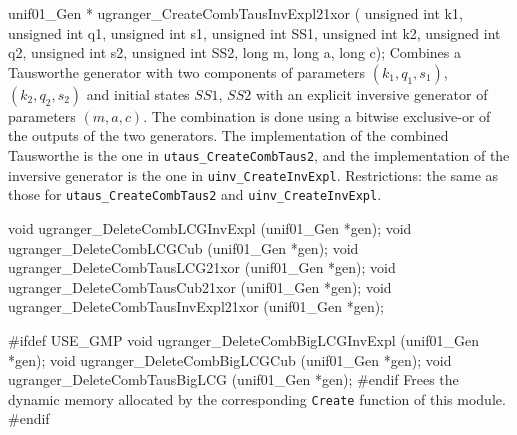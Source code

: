 unif01_Gen * ugranger_CreateCombTausInvExpl21xor (
   unsigned int k1, unsigned int q1, unsigned int s1, unsigned int SS1,
   unsigned int k2, unsigned int q2, unsigned int s2, unsigned int SS2,
   long m, long a, long c);
\endcode
 \tab Combines a Tausworthe generator  with two components of parameters
  $(k_1, q_1, s_1)$, $(k_2, q_2, s_2)$ and
  initial states $\mathit{SS1}$, $\mathit{SS2}$ with an
  explicit  inversive  generator
  of parameters  $(m, a, c)$.  The combination is done  using a
  bitwise exclusive-or of the outputs of the two generators.
  The implementation of the
  combined  Tausworthe is the one in {\tt utaus\_CreateCombTaus2},
  and the implementation of the inversive generator
  is the one in {\tt uinv\_CreateInvExpl}.
  Restrictions: the same as those for {\tt utaus\_CreateCombTaus2} and
  {\tt uinv\_CreateInvExpl}.
 \endtab


\code

void ugranger_DeleteCombLCGInvExpl (unif01_Gen *gen);
void ugranger_DeleteCombLCGCub (unif01_Gen *gen);
void ugranger_DeleteCombTausLCG21xor (unif01_Gen *gen);
void ugranger_DeleteCombTausCub21xor (unif01_Gen *gen);
void ugranger_DeleteCombTausInvExpl21xor (unif01_Gen *gen);

#ifdef USE_GMP
   void ugranger_DeleteCombBigLCGInvExpl (unif01_Gen *gen);
   void ugranger_DeleteCombBigLCGCub (unif01_Gen *gen);
   void ugranger_DeleteCombTausBigLCG (unif01_Gen *gen);
#endif
\endcode
 \tab  Frees the dynamic memory allocated by the corresponding {\tt Create}
  function of this module.
 \endtab
\code
\hide
#endif
\endhide
\endcode
